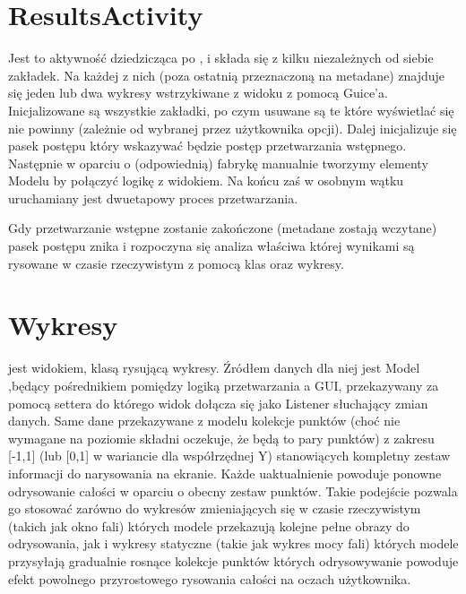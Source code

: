\section{ResultsActivity}
Jest to aktywność dziedzicząca po , i składa się z kilku niezależnych od siebie zakładek. Na każdej z nich (poza ostatnią przeznaczoną na metadane) znajduje się jeden lub dwa wykresy wstrzykiwane z widoku z pomocą Guice'a. Inicjalizowane są wszystkie zakładki, po czym usuwane są te które wyświetlać się nie powinny (zależnie od wybranej przez użytkownika opcji). Dalej inicjalizuje się pasek postępu który wskazywać będzie postęp przetwarzania wstępnego. Następnie w oparciu o (odpowiednią) fabrykę manualnie tworzymy elementy Modelu by połączyć logikę z widokiem. Na końcu zaś w osobnym wątku uruchamiany jest dwuetapowy proces przetwarzania.

Gdy przetwarzanie wstępne zostanie zakończone (metadane zostają wczytane) pasek postępu znika i rozpoczyna się analiza właściwa której wynikami są rysowane w czasie rzeczywistym z pomocą klas  oraz  wykresy.

\section{Wykresy}
 jest widokiem, klasą rysującą wykresy. Źródłem danych dla niej jest Model ,będący pośrednikiem pomiędzy logiką przetwarzania a GUI, przekazywany za pomocą settera do którego widok dołącza się jako Listener słuchający zmian danych. Same dane przekazywane z modelu kolekcje punktów (choć nie wymagane na poziomie składni oczekuje, że będą to pary punktów) z zakresu [-1,1] (lub [0,1] w wariancie  dla współrzędnej Y) stanowiących kompletny zestaw informacji do narysowania na ekranie. Każde uaktualnienie powoduje ponowne odrysowanie całości w oparciu o obecny zestaw punktów. Takie podejście pozwala go stosować zarówno do wykresów zmieniających się w czasie rzeczywistym (takich jak okno fali) których modele przekazują kolejne pełne obrazy do odrysowania, jak i wykresy statyczne (takie jak wykres mocy fali) których modele przysyłają gradualnie rosnące kolekcje punktów których odrysowywanie powoduje efekt powolnego przyrostowego rysowania całości na oczach użytkownika.

